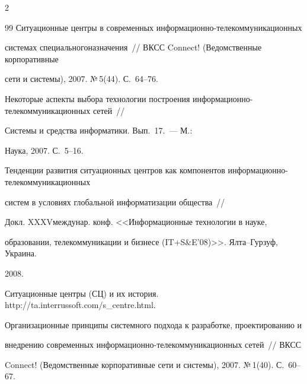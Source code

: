 \begin{multicols}{2}
{{\begin{thebibliography}{99}
Ситуа\-ционные центры в современных информационно-те\-ле\-ком\-му\-ни\-кационных 


системах специального\linebreak назначения~// ВКСС Connect! (Ведомственные корпоративные 


сети и системы), 2007. №\,5(44). С.~64--76.









Некоторые аспекты выбора технологии построения информационно-те\-ле\-ком\-муникационных сетей~// 


Системы и средства информатики. Вып.~17.~--- М.: 


Наука, 2007. С.~5--16.












Тенденции развития ситуационных центров как компонентов информационно-те\-ле\-ком\-му\-ни\-ка\-ционных 


систем в условиях глобальной информатизации общества~// 


Докл. XXXV\linebreak междунар. конф. <<Информационные технологии в науке, 


образовании, телекоммуникации и бизнесе (IT\;+\;S\&E'08)>>. Ялта--Гурзуф, Украина. 


2008.










Ситуационные центры (СЦ) и их история. {\sf http://\linebreak ta.interrussoft.com/s\_centre.html}.









Организационные принципы сис\-тем\-но\-го подхода к разработке, проектированию и 


внедрению современных информационно-те\-ле\-ком\-му\-никационных сетей~// ВКСС 


Connect! (Ведомственные корпоративные сети и системы), 2007. №\,1(40). С.~60--67.






\end{thebibliography}}}
\end{multicols}
